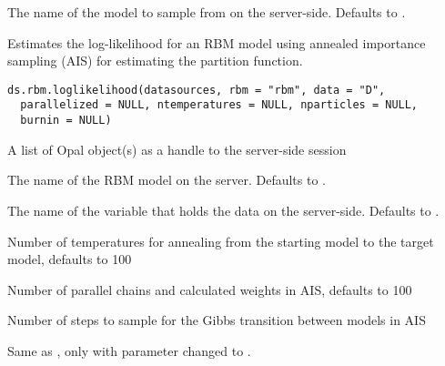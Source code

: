 %
\begin{Arguments}
\begin{ldescription}
\item[\code{rbm}] The name of the model to sample from on the server-side. Defaults to .
\end{ldescription}
\end{Arguments}
%
\begin{Description}\relax
Estimates the log-likelihood for an RBM model using annealed importance sampling (AIS)
for estimating the partition function.
\end{Description}
%
\begin{Usage}
\begin{verbatim}
ds.rbm.loglikelihood(datasources, rbm = "rbm", data = "D",
  parallelized = NULL, ntemperatures = NULL, nparticles = NULL,
  burnin = NULL)
\end{verbatim}
\end{Usage}
%
\begin{Arguments}
\begin{ldescription}
\item[\code{datasources}] A list of Opal object(s) as a handle to the server-side session

\item[\code{rbm}] The name of the RBM model on the server. Defaults to .

\item[\code{data}] The name of the variable that holds the data on the server-side.
Defaults to .

\item[\code{ntemperatures}] Number of temperatures for annealing from the starting model
to the target model, defaults to 100

\item[\code{nparticles}] Number of parallel chains and calculated weights in AIS, defaults to 100

\item[\code{burnin}] Number of steps to sample for the Gibbs transition between models in AIS
\end{ldescription}
\end{Arguments}
%
\begin{Description}\relax
Same as , only with parameter  changed to .
\end{Description}
